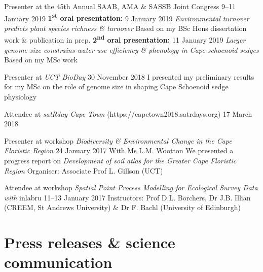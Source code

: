 \documentclass[10pt]{article}
\begin{document}
\begin{hangparas}{2em}{1}

Presenter at the 45th Annual SAAB, AMA \& SASSB Joint Congress
                                       \hfill {\small 9--11 January 2019} \break
\textbf{1\textsuperscript{st} oral presentation:}
                                           \hfill {\small 9 January 2019} \break
\textit{Environmental turnover predicts plant species richness \& turnover}
\break
Based on my BSc Hons dissertation work \& publication in prep. \break
\textbf{2\textsuperscript{nd} oral presentation:}
                                          \hfill {\small 11 January 2019} \break
\textit{Larger genome size constrains water-use efficiency \& phenology in 
Cape schoenoid sedges} \break
Based on my MSc work

Presenter at \textit{UCT BioDay}         \hfill {\small 30 November 2018} \break
I presented my preliminary results for my MSc on the role of genome size in 
shaping Cape Schoenoid sedge physiology

Attendee at \textit{satRday Cape Town} (https://capetown2018.satrdays.org)
                                                   \hfill {\small 17 March 2018}

Presenter at workshop \textit{Biodiversity \& Environmental Change in the Cape 
Floristic Region}                         \hfill {\small 24 January 2017} \break
With Ms L.M. Wootton \break
We presented a progress report on \textit{Development of soil atlas for the 
Greater Cape Floristic Region} \break
Organiser: Associate Prof L. Gillson (UCT)

Attendee at workshop \textit{Spatial Point Process Modelling for Ecological 
Survey Data with} inlabru             \hfill {\small 11--13 January 2017} \break
Instructors: Prof D.L. Borchers, Dr J.B. Illian (CREEM, St Andrews University) 
\& Dr F. Bachl (University of Edinburgh)

\hfill

\end{hangparas}

\section*{Press releases \& science communication} %
\end{document}

